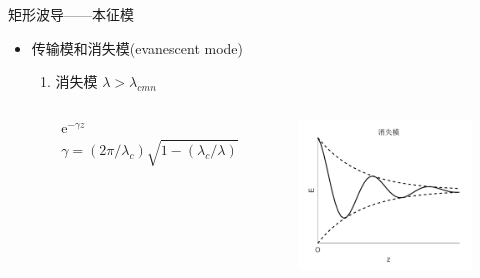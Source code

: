 \begin{frame}{矩形波导——本征模}
    \begin{itemize}
        \item 传输模和消失模(evanescent mode)\\
              \begin{enumerate}
                  \resume
                  \item 消失模 \quad $\lambda>\lambda_{cmn}$\\
                        \begin{columns}
                            \begin{column}{0.5\linewidth}
                                \begin{gather*}
                                    \mathrm{e}^{-\gamma z}\\
                                    \gamma=(2\pi/\lambda_c)\sqrt{1-(\lambda_c/\lambda)^2}
                                \end{gather*}
                            \end{column}
                            \begin{column}{0.5\linewidth}
                                \begin{figure}
                                    \includegraphics[width=5cm]{Cha6//fig6-11.pdf}
                                \end{figure}
                            \end{column}
                        \end{columns}
              \end{enumerate}
    \end{itemize}
\end{frame}

